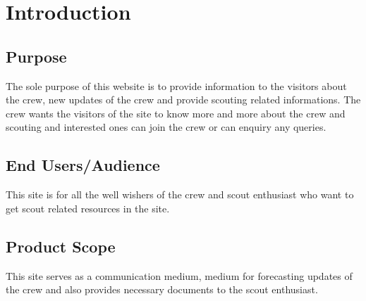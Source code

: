 \chapter{Introduction}
\section{Purpose}
    The sole purpose of this website is to provide information to the visitors about the crew, new updates of the crew and provide scouting related informations. The crew wants the visitors of the site to know more and more about the crew and scouting and interested ones can join the crew or can enquiry any queries.
\section{End Users/Audience}
    This site is for all the well wishers of the crew and scout enthusiast who want to get scout related resources in the site.
\section{Product Scope}
    This site serves as a communication medium, medium for forecasting updates of the crew and also provides necessary documents to the scout enthusiast.

